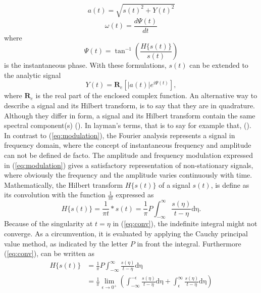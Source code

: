 \documentclass[../Main/thesis.tex]{subfiles}
\begin{document}
\begin{equation}\label{eq:amplitude}
a(t) = \sqrt{s(t)^{2} + Y(t)^{2} }
\end{equation}
\begin{equation}\label{eq:frequency}
\omega(t) = \frac{d \Psi(t)}{dt} 
\end{equation}
where 
\begin{equation}\label{eq:phase}
\Psi(t) = \tan^{-1}\left(\frac{H\{s(t) \}}{s(t)} \right)
\end{equation}
is the instantaneous phase. With these formulations, $s(t)$ can be extended to the analytic signal
\begin{equation}\label{eq:modulation}
Y(t) = \mathbf{R}_{e}\left[|a(t)|e^{i \Psi(t)} \right],
\end{equation}
where $\mathbf{R}_{e}$ is the real part of the enclosed complex function. 
\justify
An alternative way to describe a signal and its Hilbert transform, is to say that they are in quadrature. Although they differ in form, a signal and its Hilbert transform contain the same spectral component(s) (\cite{gabor1944}). In layman's terms, that is to say for example that,  (\cite{gabor1944}).
\justify
In contrast to (\ref{eq:modulation}), the Fourier analysis represents a signal in frequency domain, where the concept of instantaneous frequency and amplitude can not be defined de facto. The amplitude and frequency modulation expressed in (\ref{eq:modulation}) gives a satisfactory representation of non-stationary signals, where obviously the frequency and the amplitude varies continuously with time.
\justify
Mathematically, the Hilbert transform $H\{ s(t) \}$ of a signal $s(t)$, is define as its convolution with the function $\frac{1}{\pi t}$ expressed as
\begin{equation}\label{eq:conv}
H\{ s(t) \} = \frac{1}{\pi t}* s(t) = 	\frac{1}{\pi}P \int_{-\infty}^{\infty}\frac{s(\eta)}{t-\eta}\mathrm{d\eta}.
\end{equation}
Because of the singularity at $t=\eta$ in (\ref{eq:conv}), the indefinite integral might not converge. As a circumvention, it is evaluated by applying the Cauchy principal value method, as indicated by the letter $P$ in front the integral. Furthermore (\ref{eq:conv}), can be written as
\begin{equation}
\begin{split}
H\{ s(t) \} &=  \frac{1}{\pi}P \int_{-\infty}^{\infty}\frac{s(\eta)}{t-\eta}\mathrm{d\eta}\\
&= \frac{1}{\pi}\lim_{\epsilon\rightarrow 0^{+}} \left( \int_{-\infty}^{-\epsilon} \frac{s(\eta)}{t-\eta}\mathrm{d\eta} +   \int_{\epsilon}^{\infty} \frac{s(\eta)}{t-\eta}\mathrm{d\eta}     \right)
\end{split}
\end{equation}
\justify
\end{document}

